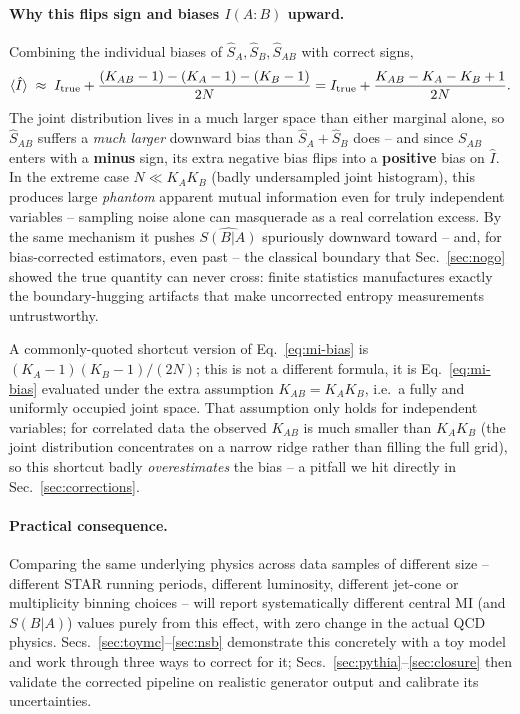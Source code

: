 \documentclass[11pt]{article}
\newcommand{\SBA}{S(B|A)}
\newcommand{\Itrue}{I_{\rm true}}
\begin{document}
\paragraph{Why this flips sign and biases $I(A{:}B)$ upward.} Combining
the individual biases of $\hat S_A,\hat S_B,\hat S_{AB}$ with correct
signs,
\begin{equation}
\langle\hat I\rangle \;\approx\; \Itrue +
\frac{(K_{AB}-1)-(K_A-1)-(K_B-1)}{2N}
= \Itrue + \frac{K_{AB}-K_A-K_B+1}{2N}.
\label{eq:mi-bias}
\end{equation}
The joint distribution lives in a much larger space than either marginal
alone, so $\hat S_{AB}$ suffers a \emph{much larger} downward bias than
$\hat S_A+\hat S_B$ does -- and since $S_{AB}$ enters with a
\textbf{minus} sign, its extra negative bias flips into a \textbf{positive}
bias on $\hat I$. In the extreme case $N \ll K_A K_B$ (badly undersampled
joint histogram), this produces large \emph{phantom} apparent mutual
information even for truly independent variables -- sampling noise alone
can masquerade as a real correlation excess. By the same mechanism it
pushes $\widehat{\SBA}$ spuriously downward toward -- and, for
bias-corrected estimators, even past -- the classical boundary that
Sec.~\ref{sec:nogo} showed the true quantity can never cross: finite
statistics manufactures exactly the boundary-hugging artifacts that make
uncorrected entropy measurements untrustworthy.

A commonly-quoted shortcut version of Eq.~\eqref{eq:mi-bias} is
$(K_A-1)(K_B-1)/(2N)$; this is not a different formula, it is
Eq.~\eqref{eq:mi-bias} evaluated under the extra assumption
$K_{AB}=K_AK_B$, i.e.\ a fully and uniformly occupied joint space. That
assumption only holds for independent variables; for correlated data the
observed $K_{AB}$ is much smaller than $K_AK_B$ (the joint distribution
concentrates on a narrow ridge rather than filling the full grid), so this
shortcut badly \emph{overestimates} the bias -- a pitfall we hit directly
in Sec.~\ref{sec:corrections}.

\paragraph{Practical consequence.} Comparing the same underlying physics
across data samples of different size -- different STAR running periods,
different luminosity, different jet-cone or multiplicity binning choices
-- will report systematically different central MI (and $\SBA$) values
purely from this effect, with zero change in the actual QCD physics.
Secs.~\ref{sec:toymc}--\ref{sec:nsb} demonstrate this concretely with a
toy model and work through three ways to correct for it;
Secs.~\ref{sec:pythia}--\ref{sec:closure} then validate the corrected
pipeline on realistic generator output and calibrate its uncertainties.
\end{document}
